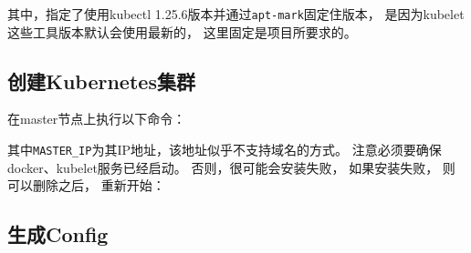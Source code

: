 \documentclass[12pt]{article}
\begin{document}
其中，指定了使用kubectl 1.25.6版本并通过\texttt{apt-mark}固定住版本， 是因为kubelet这些工具版本默认会使用最新的， 这里固定是项目所要求的。

\subsection{创建Kubernetes集群}\label{ux521bux5efakubernetesux96c6ux7fa4}

在master节点上执行以下命令：

\begin{Shaded}
\begin{Highlighting}[]

\OperatorTok{=}
\OperatorTok{=}\VariableTok{$(} \VariableTok{)}
\OperatorTok{=}
\OperatorTok{=}

\DataTypeTok{\textbackslash{}}
  \OperatorTok{=}\DataTypeTok{\textbackslash{}}
  \OperatorTok{=} \DataTypeTok{\textbackslash{}}
    \DataTypeTok{\textbackslash{}}
    \DataTypeTok{\textbackslash{}}
   
\end{Highlighting}
\end{Shaded}

其中\texttt{MASTER\_IP}为其IP地址，该地址似乎不支持域名的方式。 注意必须要确保docker、kubelet服务已经启动。 否则，很可能会安装失败， 如果安装失败， 则可以删除之后， 重新开始：

\begin{Shaded}
\begin{Highlighting}[]
\end{Highlighting}
\end{Shaded}

\subsection{生成Config}\label{ux751fux6210config}
\end{document}
